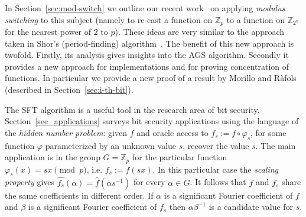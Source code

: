 \documentclass[11pt]{article}
\theoremstyle{definition}
\newcommand{\Z}{\mathbb{Z}}
\begin{document}
In Section~\ref{sec:mod-switch} we outline our recent work~\cite{LS} on applying \emph{modulus switching} to this subject (namely to re-cast a function on $\Z_p$ to a function on $\Z_{2^n}$ for the nearest power of $2$ to $p$).
These ideas are very similar to the approach taken in Shor's (period-finding) algorithm~\cite{Shor}.
The benefit of this new approach is twofold. Firstly, its analysis gives insights into the AGS algorithm. Secondly it provides a new approach for implementations and for proving concentration of functions. In particular we provide a new proof of a result by Morillo and R{\` a}fols~\cite{MR} (described in Section~\ref{sec:i-th-bit}). %

The SFT algorithm is a useful tool in the research area of bit security.
Section~\ref{sec_applications} surveys bit security applications using the language of the \emph{hidden number problem}: given $f$ and oracle access to $f_s := f \circ \varphi_s$, for some function $\varphi$ parameterized by an unknown value $s$, recover the value $s$.
The main application is in the group $G=\Z_p$ for the particular function $\varphi_s(x) = sx \pmod{p}$, i.e. $f_s := f(s x)$. In this particular case the \emph{scaling property} gives $\widehat{f_s}(\alpha) = \widehat{f}(\alpha s^{-1})$ for every $\alpha \in G$. It follows that $f$ and $f_s$ share the same coefficients in different order. If $\alpha$ is a significant Fourier coefficient of $f$ and $\beta$ is a significant Fourier coefficient of $f_s$ then $\alpha \beta^{-1}$ is a candidate value for $s$.
\end{document}
